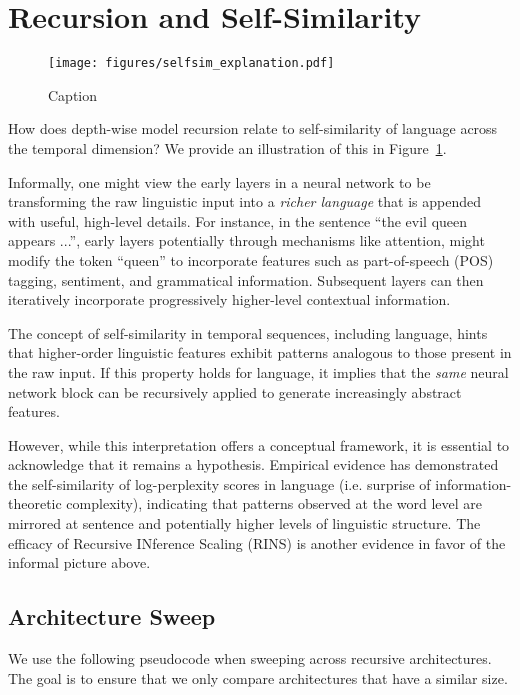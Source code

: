 \newpage 

\section{Recursion and Self-Similarity}\label{app:selfsim}
\begin{figure}[h]
    \centering
    \texttt{[image: figures/selfsim\_explanation.pdf]}
    \caption{Caption}
    \label{fig:selfsim_exp}
\end{figure}

How does depth-wise model recursion relate to self-similarity of language across the temporal dimension? We provide an illustration of this in Figure~\ref{fig:selfsim_exp}. 

Informally, one might view the early layers in a neural network to be transforming the raw linguistic input into a \emph{richer language} that is appended with useful, high-level details. For instance, in the sentence ``the evil queen appears ...'', early layers potentially through mechanisms like attention, might modify the token ``queen'' to incorporate features such as part-of-speech (POS) tagging, sentiment, and grammatical information. Subsequent layers can then iteratively incorporate progressively higher-level contextual information.

The concept of self-similarity in temporal sequences, including language, hints that higher-order linguistic features exhibit patterns analogous to those present in the raw input.  If this property holds for language, it implies that the \emph{same} neural network block can be recursively applied to generate increasingly abstract features.

However, while this interpretation offers a conceptual framework, it is essential to acknowledge that it remains a hypothesis. Empirical evidence has demonstrated the self-similarity of log-perplexity scores in language (i.e. surprise of information-theoretic complexity), indicating that patterns observed at the word level are mirrored at sentence and potentially higher levels of linguistic structure. The efficacy of Recursive INference Scaling (RINS) is another evidence in favor of the informal picture above.


\newpage

\subsection{Architecture Sweep}
We use the following pseudocode when sweeping across recursive architectures. The goal is to ensure that we only compare architectures that have a similar size.

